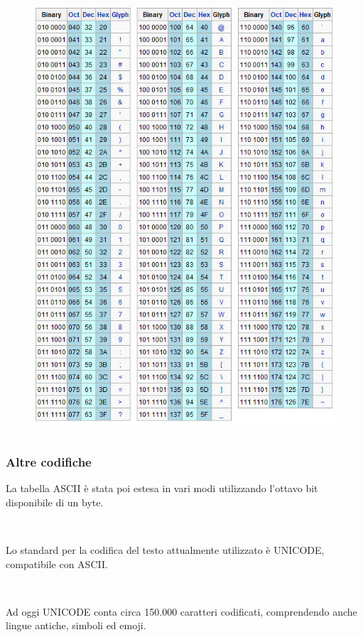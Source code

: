 \documentclass[handout]{beamer}
\begin{document}
\begin{frame}
\begin{columns}
\begin{column}{.33\textwidth}
\begin{center}
\begin{figure}
      \includegraphics[width=\columnwidth]{img/ascii3.jpg}
    \end{figure}
  \end{center}
\end{column}
\end{columns}
\end{frame}


\begin{frame}
\frametitle{Altre codifiche}
La tabella ASCII è stata poi estesa in vari modi utilizzando l'ottavo bit disponibile di un byte.\pause

~

Lo standard per la codifica del testo attualmente utilizzato è \alert<2>{UNICODE}, compatibile con ASCII.\pause

~

Ad oggi UNICODE conta circa 150.000 caratteri codificati, comprendendo anche lingue antiche, simboli ed emoji.
\end{frame}
\end{document}
